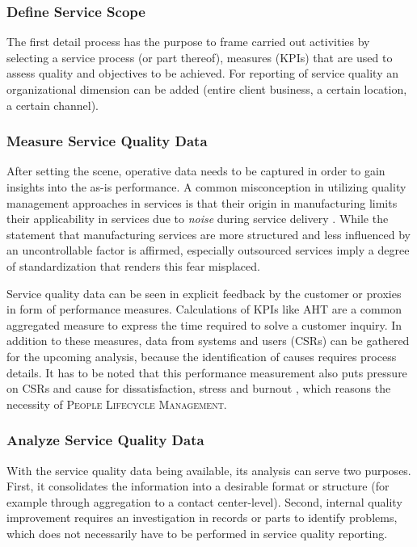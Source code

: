 \begin{figure}[caption={\textsc{Quality Management} Process}, label={fig:qualmang}]
\begin{subfigure}[c]{.6\textwidth}
\begin{center}
\begin{tikzpicture}
				
				\end{tikzpicture}
			\end{center}
		\end{subfigure}
	\end{figure}
	
	\subsubsection{Define Service Scope}
	The first detail process has the purpose to frame carried out activities by selecting a service process (or part thereof), measures (\acrshort{KPI}s) that are used to assess quality and objectives to be achieved. For reporting of service quality an organizational dimension can be added (entire client business, a certain location, a certain channel). 
	\subsubsection{Measure Service Quality Data}
	After setting the scene, operative data needs to be captured in order to gain insights into the as-is performance. A common misconception in utilizing quality management approaches in services is that their origin in manufacturing limits their applicability in services due to \textit{noise} during service delivery \citep{Antony_2007}. While the statement that manufacturing services are more structured and less influenced by an uncontrollable factor is affirmed, especially outsourced services imply a degree of standardization that renders this fear misplaced. 
	
	Service quality data can be seen in explicit feedback by the customer or proxies in form of performance measures. Calculations of \acrshort{KPI}s like \acrfull{AHT} are a common aggregated measure to express the time required to solve a customer inquiry. In addition to these measures, data from systems and users (\acrshort{CSR}s) can be gathered for the upcoming analysis, because the identification of causes requires process details. It has to be noted that this performance measurement  also puts pressure on \acrshort{CSR}s and cause for dissatisfaction, stress and burnout \citep[]{Aksin_2009}, which reasons the necessity of \textsc{People Lifecycle Management}.
	
	\subsubsection{Analyze Service Quality Data}
	With the service quality data being available, its analysis can serve two purposes. First, it consolidates the information into a desirable format or structure (for example through aggregation to a contact center-level). Second, internal quality improvement requires an investigation in records or parts to identify problems, which does not necessarily have to be performed in service quality reporting. 
	
